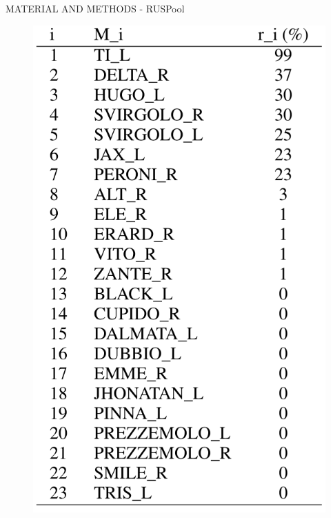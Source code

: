 \begin{frame}{MATERIAL AND METHODS - RUSPool}
\begin{minipage}{\linewidth}
\begin{minipage}{0.45\linewidth}
\begin{figure}[h!]
                \centering
                \includegraphics[width = 0.5\linewidth]{images/paper10/ri.png}
                \centering
            \end{figure}
        \end{minipage}
    \end{minipage}
    
\end{frame}

